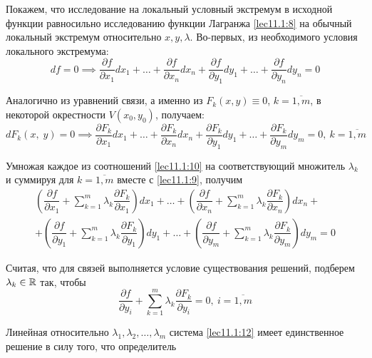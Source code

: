 \documentclass[../../main.tex]{subfiles}
\begin{document}
	
	Покажем, что исследование на локальный условный экстремум в исходной 
	функции равносильно исследованию функции Лагранжа 
	\eqref{lec11.1:8} на обычный локальный экстремум относительно $x, y,\lambda$.
	Во-первых, из необходимого условия локального экстремума:
	\begin{equation}
	df = 0 \implies \dfrac{\partial f}{\partial x_1} dx_1 + \ldots + 
	\dfrac{\partial f}{\partial x_n} dx_n + \dfrac{\partial f}{\partial y_1}dy_1
	 + \ldots + \dfrac{\partial f}{\partial y_n} dy_n = 0 \label{lec11.1:9}
	\end{equation}
	
	Аналогично из уравнений связи, а именно из $F_k(x, y) \equiv 0$, $k = \overline{1, 
	m}$, в некоторой окрестности $V(x_0, y_0)$, получаем:
	\begin{equation}
	dF_k\left(x, \; y\right) = 0 \implies \dfrac{\partial 
	F_k}{\partial x_1}dx_1 + 
	\ldots + \dfrac{\partial F_k}{\partial x_n}dx_n + 
	\dfrac{\partial F_k}{\partial y_1}dy_1 + \ldots + 
	\dfrac{\partial F_k}{\partial y_m}dy_m = 0,\ k = \overline{1, m} 
	\label{lec11.1:10}
	\end{equation}
	
	Умножая каждое из соотношений \eqref{lec11.1:10} на соответствующий множитель 
	$\lambda_k$ и суммируя для $k = \overline{1, m}$ 
	вместе с \eqref{lec11.1:9}, получим
	\begin{multline}
	\left(\dfrac{\partial f}{\partial x_1} + \sum\limits_{k
	= 1}^m \lambda_k \dfrac{\partial F_k}{\partial x_1} 
	\right)dx_1 + \ldots + \left(\dfrac{\partial f}
	{\partial x_n} + \sum\limits_{k = 1}^m \lambda_k 
	\dfrac{\partial F_k}{\partial x_n} \right)dx_n + \\ +
	\left(\dfrac{\partial f}{\partial y_1} + 
	\sum\limits_{k = 1}^m \lambda_k \dfrac{\partial F_k}
	{\partial y_1} \right)dy_1 +
	\ldots 
	+ \left(\dfrac{\partial f}{\partial y_m} + 
	\sum\limits_{k = 1}^m \lambda_k \dfrac{\partial F_k}
	{\partial y_m} \right)dy_m = 0 \label{lec11.1:11}
	\end{multline}
	
	Считая, что для связей выполняется условие существования 
	решений, подберем $\lambda_k \in \mathbb{R}$ так, чтобы
	\begin{equation}
	\dfrac{\partial f}{\partial y_i} + \sum\limits_{k = 1}^m \lambda_k 
	\dfrac{\partial F_k}{\partial y_i} = 0,\ i = \overline{1,m} 
	\label{lec11.1:12}
	\end{equation}
	
	Линейная относительно $\lambda_1, \lambda_2, \ldots, \lambda_m$ система 
	\eqref{lec11.1:12} имеет единственное решение в силу того, что определитель
	
\end{document}
